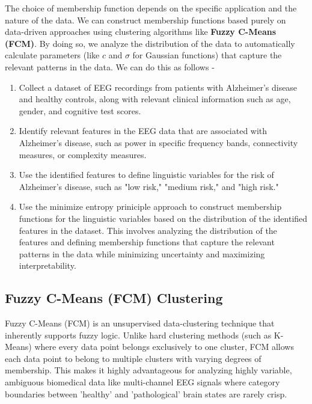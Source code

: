 \documentclass[openany]{book}
\begin{document}
The choice of membership function depends on the specific application and the nature of the data. We can construct membership functions based purely on data-driven approaches using clustering algorithms like \textbf{Fuzzy C-Means (FCM)}. By doing so, we analyze the distribution of the data to automatically calculate parameters (like $c$ and $\sigma$ for Gaussian functions) that capture the relevant patterns in the data. We can do this as follows - \\
\begin{enumerate}
    \item Collect a dataset of EEG recordings from patients with Alzheimer's disease and healthy controls, along with relevant clinical information such as age, gender, and cognitive test scores.
    \item Identify relevant features in the EEG data that are associated with Alzheimer's disease, such as power in specific frequency bands, connectivity measures, or complexity measures. 
    \item Use the identified features to define linguistic variables for the risk of Alzheimer's disease, such as "low risk," "medium risk," and "high risk."
    \item Use the minimize entropy priniciple approach to construct membership functions for the linguistic variables based on the distribution of the identified features in the dataset. This involves analyzing the distribution of the features and defining membership functions that capture the relevant patterns in the data while minimizing uncertainty and maximizing interpretability.
\end{enumerate}

\subsection{Fuzzy C-Means (FCM) Clustering}
\label{subsec:fcm}
Fuzzy C-Means (FCM) is an unsupervised data-clustering technique that inherently supports fuzzy logic. Unlike hard clustering methods (such as K-Means) where every data point belongs exclusively to one cluster, FCM allows each data point to belong to multiple clusters with varying degrees of membership. This makes it highly advantageous for analyzing highly variable, ambiguous biomedical data like multi-channel EEG signals where category boundaries between 'healthy' and 'pathological' brain states are rarely crisp.
\end{document}
